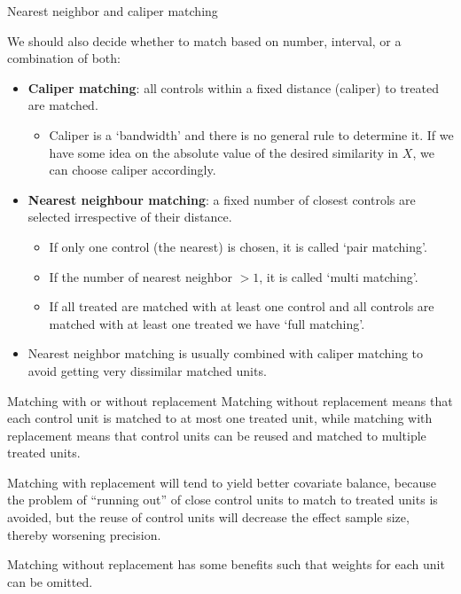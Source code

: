 \documentclass[handout]{beamer}
\begin{document}
\begin{frame}{Nearest neighbor and caliper matching}
	
We should also decide whether to match based on number, interval, or a combination of both:\medskip
\begin{itemize}
	\item \textbf{Caliper matching}: all controls within a fixed distance (caliper) to treated are matched.
	\begin{itemize}
		\item Caliper is a `bandwidth' and there is no general rule to determine it. If we have some idea on the absolute value of the desired similarity in $X$, we can choose caliper accordingly.
	\end{itemize}\medskip

	\item \textbf{Nearest neighbour matching}: a fixed number of closest controls are selected irrespective of their distance.
	\begin{itemize}
		\item If only one control (the nearest) is chosen, it is called `pair matching'.
		\item If the number of nearest neighbor $>1$, it is called `multi matching'.
		\item If all treated are matched with at least one control and all controls are matched with at least one treated we have `full matching'.
	\end{itemize} 
	\item Nearest neighbor matching is usually combined with caliper matching to avoid getting very dissimilar matched units.
\end{itemize}
\end{frame}

\begin{frame}{Matching with or without replacement}
	Matching without replacement means that each control unit is matched to at most one treated unit, while matching with replacement means that control units can be reused and matched to multiple treated units.\bigskip 
	
	Matching with replacement will tend to yield better covariate balance, because the problem of ``running out'' of close control units to match to treated units is avoided, but the reuse of control units will decrease the effect sample size, thereby worsening precision. \bigskip
	
	Matching without replacement has some benefits such that weights for each unit can be omitted.
\end{frame}
\end{document}
